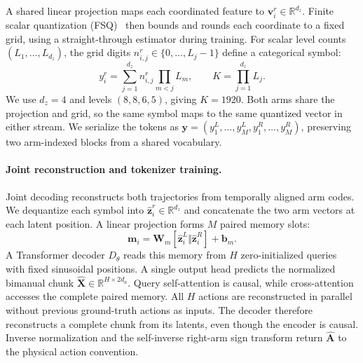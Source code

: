 A shared linear projection maps each coordinated feature to
$\mathbf{v}^{r}_{i}\in\mathbb{R}^{d_z}$. Finite scalar quantization
(FSQ)~\cite{mentzer2024fsq} then bounds and rounds each coordinate to a fixed
grid, using a straight-through estimator during training. For scalar level
counts $(L_1,\ldots,L_{d_z})$, the grid digits
$n^{r}_{i,j}\in\{0,\ldots,L_j-1\}$ define a categorical symbol:
\begin{equation}
    y^{r}_{i}=\sum_{j=1}^{d_z}n^{r}_{i,j}\prod_{m<j}L_m,
    \qquad K=\prod_{j=1}^{d_z}L_j.
    \label{eq:bicat_quantization}
\end{equation}
We use $d_z=4$ and levels $(8,8,6,5)$, giving $K=1920$. Both arms share the
projection and grid, so the same symbol maps to the same quantized vector in
either stream. We serialize the tokens as
$\mathbf{y}=(y^{L}_{1},\ldots,y^{L}_{M},
y^{R}_{1},\ldots,y^{R}_{M})$, preserving two arm-indexed blocks from a
shared vocabulary.

\paragraph{Joint reconstruction and tokenizer training.}
Joint decoding reconstructs both trajectories from temporally aligned arm
codes. We dequantize each symbol into
$\widehat{\mathbf{z}}^{r}_{i}\in\mathbb{R}^{d_z}$ and concatenate the two
arm vectors at each latent position. A linear projection forms $M$ paired
memory slots:
\begin{equation}
    \mathbf{m}_{i}=\mathbf{W}_{m}
    [\widehat{\mathbf{z}}^{L}_{i}\Vert
    \widehat{\mathbf{z}}^{R}_{i}]+\mathbf{b}_{m}.
    \label{eq:bicat_paired_memory}
\end{equation}
A Transformer decoder $D_{\theta}$ reads this memory from $H$ zero-initialized queries
with fixed sinusoidal positions. A single output head predicts the normalized
bimanual chunk $\widehat{\mathbf{X}}\in\mathbb{R}^{H\times 2d_a}$.
Query self-attention is causal, while cross-attention accesses the complete
paired memory. All $H$ actions are reconstructed in parallel without previous
ground-truth actions as inputs. The decoder therefore reconstructs a complete
chunk from its latents, even though the encoder is causal. Inverse
normalization and the self-inverse right-arm sign transform return
$\widehat{\mathbf{A}}$ to the physical action convention.

